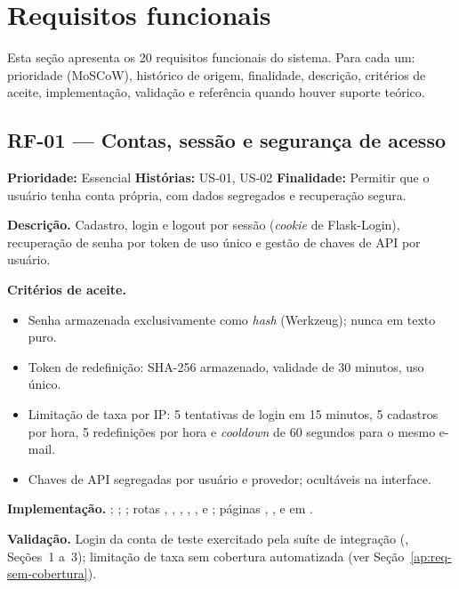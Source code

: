 \section{Requisitos funcionais}
\label{ap:req-funcionais}

Esta seção apresenta os 20 requisitos funcionais do sistema. Para cada um: prioridade (MoSCoW), histórico de origem, finalidade, descrição, critérios de aceite, implementação, validação e referência quando houver suporte teórico.

\subsection{RF-01 --- Contas, sessão e segurança de acesso}

\textbf{Prioridade:} Essencial \quad \textbf{Histórias:} US-01, US-02 \quad \textbf{Finalidade:} Permitir que o usuário tenha conta própria, com dados segregados e recuperação segura.

\textbf{Descrição.} Cadastro, login e logout por sessão (\emph{cookie} de Flask-Login), recuperação de senha por token de uso único e gestão de chaves de API por usuário.

\textbf{Critérios de aceite.}
\begin{itemize}
    \item Senha armazenada exclusivamente como \emph{hash} (Werkzeug); nunca em texto puro.
    \item Token de redefinição: SHA-256 armazenado, validade de 30 minutos, uso único.
    \item Limitação de taxa por IP: 5 tentativas de login em 15 minutos, 5 cadastros por hora, 5 redefinições por hora e \emph{cooldown} de 60 segundos para o mesmo e-mail.
    \item Chaves de API segregadas por usuário e provedor; ocultáveis na interface.
\end{itemize}

\textbf{Implementação.} ; ; ; rotas \texttt{}, \texttt{}, \texttt{}, \texttt{}, \texttt{}, \texttt{} e \texttt{}; páginas \texttt{}, \texttt{}, \texttt{} e \texttt{} em .

\textbf{Validação.} Login da conta de teste exercitado pela suíte de integração (\texttt{}, Seções~1 a~3); limitação de taxa sem cobertura automatizada (ver Seção~\ref{ap:req-sem-cobertura}).

